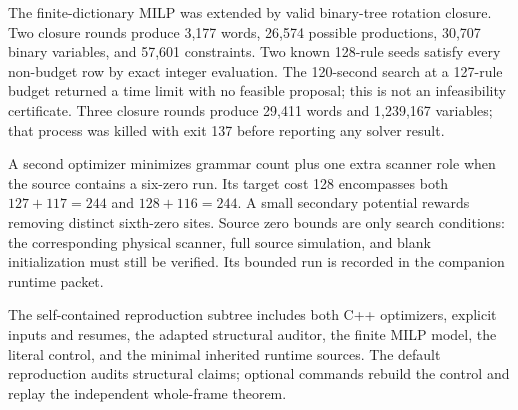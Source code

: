 The finite-dictionary MILP was extended by valid binary-tree rotation closure.
Two closure rounds produce 3,177 words, 26,574 possible productions, 30,707
binary variables, and 57,601 constraints. Two known 128-rule seeds satisfy
every non-budget row by exact integer evaluation. The 120-second search at a
127-rule budget returned a time limit with no feasible proposal; this is not
an infeasibility certificate. Three closure rounds produce 29,411 words and
1,239,167 variables; that process was killed with exit 137 before reporting
any solver result.

A second optimizer minimizes grammar count plus one extra scanner role when
the source contains a six-zero run. Its target cost 128 encompasses both
$127+117=244$ and $128+116=244$. A small secondary potential rewards removing
distinct sixth-zero sites. Source zero bounds are only search conditions:
the corresponding physical scanner, full source simulation, and blank
initialization must still be verified. Its bounded run is recorded in the
companion runtime packet.

The self-contained reproduction subtree includes both C++ optimizers,
explicit inputs and resumes, the adapted structural auditor, the finite
MILP model, the literal control, and the minimal inherited runtime sources.
The default reproduction audits structural claims; optional commands rebuild
the control and replay the independent whole-frame theorem.
